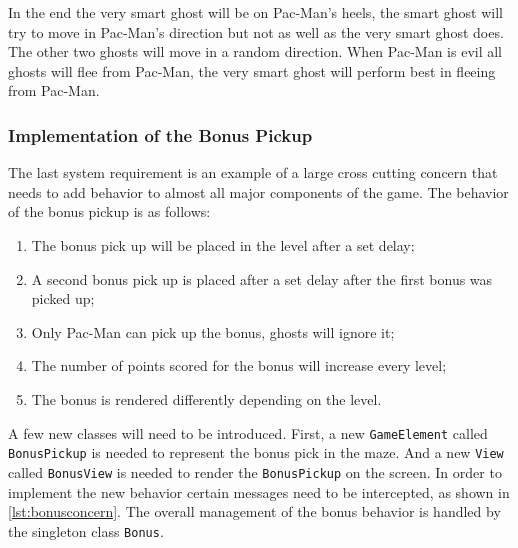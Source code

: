 In the end the very smart ghost will be on Pac-Man's heels, the smart ghost will try to move in Pac-Man's direction but not as well as the very smart ghost does. The other two ghosts will move in a random direction. When Pac-Man is evil all ghosts will flee from Pac-Man, the very smart ghost will perform best in fleeing from Pac-Man.

\subsubsection{Implementation of the Bonus Pickup}
\label{sec:ImplementationOfTheBonusPickup}

The last system requirement is an example of a large cross cutting concern that needs to add behavior to almost all major components of the game.
The behavior of the bonus pickup is as follows:
\begin{enumerate}[noitemsep]
	\samepage
	\item The bonus pick up will be placed in the level after a set delay;
	\item A second bonus pick up is placed after a set delay after the first bonus was picked up;	
	\item Only Pac-Man can pick up the bonus, ghosts will ignore it;
	\item The number of points scored for the bonus will increase every level;
	\item The bonus is rendered differently depending on the level.
\end{enumerate}

A few new classes will need to be introduced. First, a new \lstinline|GameElement| called \lstinline|BonusPickup| is needed to represent the bonus pick in the maze. And a new \lstinline|View| called \lstinline|BonusView| is needed to render the \lstinline|BonusPickup| on the screen.
In order to implement the new behavior certain messages need to be intercepted, as shown in \autoref{lst:bonusconcern}. The overall management of the bonus behavior is handled by the singleton class \lstinline|Bonus|.

